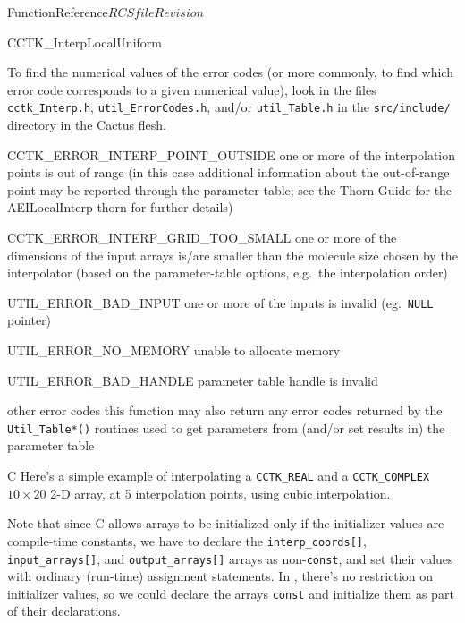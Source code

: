 \begin{cactuspart}{FunctionReference}{$RCSfile$}{$Revision$}
\begin{FunctionDescription}{CCTK\_InterpLocalUniform}
\begin{ErrorSection}
\begin{Error}{}
To find the numerical
values of the error codes (or more commonly, to find which error code
corresponds to a given numerical value), look in the files
\verb|cctk_Interp.h|, \verb|util_ErrorCodes.h|, and/or \verb|util_Table.h|
in the \verb|src/include/| directory in the Cactus flesh.
\end{Error}
\begin{Error}{CCTK\_ERROR\_INTERP\_POINT\_OUTSIDE}
one or more of the interpolation points is out of range
(in this case additional information about the out-of-range point
may be reported through the parameter table; see the Thorn Guide for
the AEILocalInterp thorn for further details)
\end{Error}
\begin{Error}{CCTK\_ERROR\_INTERP\_GRID\_TOO\_SMALL}
one or more of the dimensions of the input arrays is/are smaller than
the molecule size chosen by the interpolator (based on the parameter-table
options, e.g.\ the interpolation order)
\end{Error}
\begin{Error}{UTIL\_ERROR\_BAD\_INPUT}
one or more of the inputs is invalid (eg.~\verb|NULL| pointer)
\end{Error}
\begin{Error}{UTIL\_ERROR\_NO\_MEMORY}
unable to allocate memory
\end{Error}
\begin{Error}{UTIL\_ERROR\_BAD\_HANDLE}
parameter table handle is invalid
\end{Error}
\begin{Error}{other error codes}
this function may also return any error codes returned by the
\verb|Util_Table*()| routines used to get parameters from
(and/or set results in) the parameter table
\end{Error}
\end{ErrorSection}

\begin{ExampleSection}
\begin{Example}{C}
Here's a simple example of interpolating a \verb|CCTK_REAL| and a
\verb|CCTK_COMPLEX| $10 \times 20$ 2-D array, at 5 interpolation points,
using cubic interpolation.

Note that since C allows arrays to be initialized only if the
initializer values are compile-time constants, we have to declare the
\verb|interp_coords[]|, \verb|input_arrays[]|, and \verb|output_arrays[]|
arrays as non-\verb|const|, and set their values with ordinary (run-time)
assignment statements.  In \Cplusplus, there's no restriction on
initializer values, so we could declare the arrays \verb|const| and
initialize them as part of their declarations.


\end{Example}
\end{ExampleSection}
\end{FunctionDescription}
\end{cactuspart}
